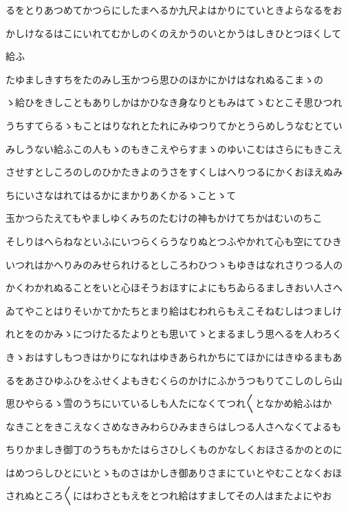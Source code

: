 \documentclass[a4paper,11pt,landscape]{ltjtarticle}
\begin{document}
\par\medskip
るをとりあつめてかつらにしたまへるか九尺よはかりにていときよらなるをお
\par\medskip
かしけなるはこにいれてむかしのくのえかうのいとかうはしきひとつほくして
\par\medskip
給ふ
\par\medskip
たゆましきすちをたのみし玉かつら思ひのほかにかけはなれぬるこまゝの
\par\medskip
ゝ給ひをきしこともありしかはかひなき身なりともみはてゝむとこそ思ひつれ
\par\medskip
うちすてらるゝもことはりなれとたれにみゆつりてかとうらめしうなむとてい
\par\medskip
みしうない給ふこの人もゝのもきこえやらすまゝのゆいこむはさらにもきこえ
\par\medskip
させすとしころのしのひかたきよのうさをすくしはへりつるにかくおほえぬみ
\par\medskip
ちにいさなはれてはるかにまかりあくかるゝことゝて
\par\medskip
玉かつらたえてもやましゆくみちのたむけの神もかけてちかはむいのちこ
\par\medskip
そしりはへらねなといふにいつらくらうなりぬとつふやかれて心も空にてひき
\par\medskip
いつれはかへりみのみせられけるとしころわひつゝもゆきはなれさりつる人の
\par\medskip
かくわかれぬることをいと心ほそうおほすによにもちゐらるましきおい人さへ
\par\medskip
ゐてやことはりそいかてかたちとまり給はむわれらもえこそねむしはつましけ
\par\medskip
れとをのかみゝにつけたるたよりとも思いてゝとまるましう思へるを人わろく
\par\medskip
きゝおはすしもつきはかりになれはゆきあられかちにてほかにはきゆるまもあ
\par\medskip
るをあさひゆふひをふせくよもきむくらのかけにふかうつもりてこしのしら山
\par\medskip
思ひやらるゝ雪のうちにいているしも人たになくてつれ〱となかめ給ふはか
\par\medskip
なきことをきこえなくさめなきみわらひみまきらはしつる人さへなくてよるも
\par\medskip
ちりかましき御丁のうちもかたはらさひしくものかなしくおほさるかのとのに
\par\medskip
はめつらしひとにいとゝものさはかしき御ありさまにていとやむことなくおほ
\par\medskip
されぬところ〱にはわさともえをとつれ給はすましてその人はまたよにやお
\end{document}
